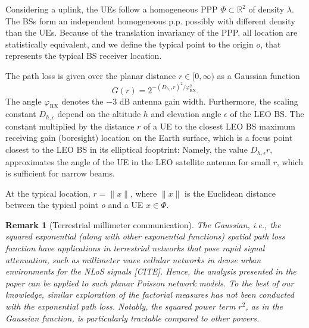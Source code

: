 \documentclass[lettersize,journal]{IEEEtran}
\newcommand{\R}{\mathbb{R}}
\newtheorem*{remark}{Remark}
\begin{document}
Considering a uplink, the UEs follow a homogeneous PPP $\Phi \subset \R^2$ of density $\lambda$. The BSs form an independent homogeneous p.p. possibly with different density than the UEs. Because of the translation invariancy of the PPP, all location are statistically equivalent, and we define the typical point to the origin $\textit{o}$, that represents the typical BS receiver location.



The path loss is given over the planar distance $r \in [0, \infty)$ as a Gaussian function
  \begin{equation}
    \label{eq:Gaussianantpat}
    G(r) = 2^{-(D_{h,\epsilon}r)^2 / \varphi_{\text{RX}}^2}.
  \end{equation}
  The angle $\varphi_{\text{RX}}$ denotes the $-3$ dB antenna gain width. Furthermore, the scaling constant $D_{h,\epsilon}$ depend on the altitude $h$ and elevation angle $\epsilon$ of the LEO BS. The constant multiplied by the distance $r$ of a UE to the closest LEO BS maximum receiving gain (boresight) location on the Earth surface, which is a focus point closest to the LEO BS in its elliptical fooptrint: Namely, the value $D_{h,\epsilon}r$, approximates the angle of the UE in the LEO satellite antenna for small $r$, which is sufficient for narrow beams. %

  At the typical location, $r=\|x\|$, where $\| x\|$ is the Euclidean distance between the typical point \textit{o} and a UE $x\in \Phi$.


  \begin{remark}[Terrestrial millimeter communication]
    The Gaussian, \textit{i.e.}, the squared exponential (along with other exponential functions) spatial path loss function have applications in terrestrial networks that pose rapid signal attenuation, such as millimeter wave cellular networks in dense urban environments for the NLoS signals [CITE]. Hence, the analysis presented in the paper can be applied to such planar Poisson network models. To the best of our knowledge, similar exploration of the factorial measures has not been conducted with the exponential path loss.  Notably, the squared power term $r^2$, as in the Gaussian function, is particularly tractable compared to other powers. 
  \end{remark}
\end{document}
